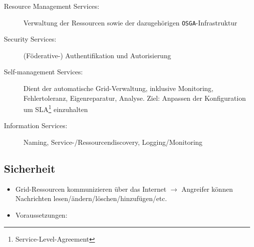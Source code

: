 \begin{itemize}
\begin{itemize}
\begin{description}
			\item[Resource Management Services:] Verwaltung der Ressourcen sowie der dazugehörigen \texttt{OSGA}-Infrastruktur
			\item[Security Services:] (Föderative-) Authentifikation und Autorisierung
			\item[Self-management Services:] Dient der automatische Grid-Verwaltung, inklusive Monitoring, Fehlertoleranz, Eigenreparatur, Analyse. Ziel: Anpassen der Konfiguration um SLA\footnote{Service-Level-Agreement} einzuhalten
			\item[Information Services:] Naming, Service-/Ressourcendiscovery, Logging/Monitoring
		\end{description}
	\end{itemize}
\end{itemize}


\subsection{Sicherheit}
\begin{itemize}
	\item Grid-Ressourcen kommunizieren über das Internet \(\rightarrow\) Angreifer können Nachrichten lesen/ändern/löschen/hinzufügen/etc.
	\item Voraussetzungen: 
\end{itemize}

















